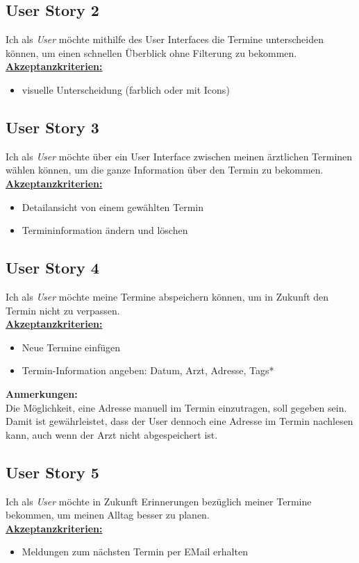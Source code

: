 \documentclass[conference]{IEEEtran}
\begin{document}
\subsection{User Story 2}
Ich als \textit{User} möchte mithilfe des User Interfaces die Termine unterscheiden können, um einen schnellen Überblick ohne Filterung zu bekommen.\\
\underline{\textbf{Akzeptanzkriterien:}}
\begin{itemize}
	\item visuelle Unterscheidung (farblich oder mit Icons)
\end{itemize}

\subsection{User Story 3}
Ich als \textit{User} möchte über ein User Interface zwischen meinen ärztlichen Terminen wählen können, um die ganze Information über den Termin zu bekommen.\\
\underline{\textbf{Akzeptanzkriterien:}}
\begin{itemize}
	\item Detailansicht von einem gewählten Termin
	\item Termininformation ändern und löschen
\end{itemize}

\subsection{User Story 4}
Ich als \textit{User} möchte meine Termine abspeichern können, um in Zukunft den Termin nicht zu verpassen.\\
\underline{\textbf{Akzeptanzkriterien:}}
\begin{itemize}
	\item Neue Termine einfügen
	\item Termin-Information angeben: Datum, Arzt, Adresse, Tags*
\end{itemize}
\textbf{Anmerkungen:}\\
Die Möglichkeit, eine Adresse manuell im Termin einzutragen, soll gegeben sein. Damit ist gewährleistet, dass der User dennoch eine Adresse im Termin nachlesen kann, auch wenn der Arzt nicht abgespeichert ist. 


\subsection{User Story 5}
Ich als \textit{User} möchte in Zukunft Erinnerungen bezüglich meiner Termine bekommen, um meinen Alltag besser zu planen.\\
\underline{\textbf{Akzeptanzkriterien:}}
\begin{itemize}
	\item Meldungen zum nächsten Termin per EMail erhalten
\end{itemize}
\end{document}
